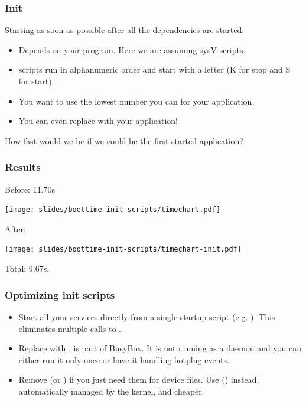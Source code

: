\begin{frame}
\frametitle{Init}
Starting as soon as possible after all the dependencies are started:
\begin{itemize}
	\item Depends on your  program. Here we are assuming sysV
	       scripts.
	\item {} scripts run in alphanumeric order and start with
	      a letter (K for stop and S for start).
	\item You want to use the lowest number you can for your application.
	\item You can even replace  with your application!
\end{itemize}
How fast would we be if we could be the first started application?
\end{frame}

\begin{frame}
\frametitle{Results}
Before: 11.70s
\begin{center}
    \texttt{[image: slides/boottime-init-scripts/timechart.pdf]}
\end{center}
After:
\begin{center}
    \texttt{[image: slides/boottime-init-scripts/timechart-init.pdf]}
\end{center}
Total: 9.67s.
\end{frame}

\begin{frame}
\frametitle{Optimizing init scripts}
\begin{itemize}
	\item Start all your services directly from a single startup
	      script (e.g. ). This eliminates multiple
	      calls to .
	\item Replace  with .  is part of
	      BusyBox. It is not running as a daemon and you can either run it
   	      only once or have it handling hotplug events.
	\item Remove  (or ) if you just need them
	      for device files.  Use 
	      () instead, automatically managed by the
	      kernel, and cheaper.
\end{itemize}
\end{frame}

